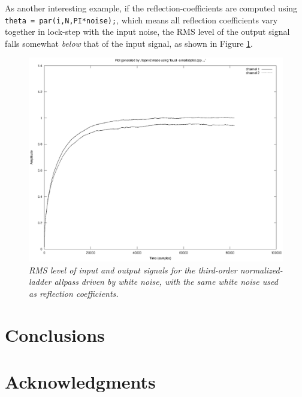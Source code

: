 \documentclass[twoside,a4paper]{article}
\begin{document}
As another interesting example, if the reflection-coefficients are
computed using \verb!theta = par(i,N,PI*noise);!, which means all
reflection coefficients vary together in lock-step with the input
noise, the RMS level of the output signal falls somewhat \emph{below}
that of the input signal, as shown in Figure \ref{tapnn2tc}.

\begin{figure}[ht]
\center
\includegraphics[width=6.5in]{eps/tapnn2tc.eps}
\caption{\label{tapnn2tc}{\it RMS level of input and output signals
for the third-order normalized-ladder allpass driven by white noise,
with the same white noise used as reflection coefficients.}}
\end{figure} 

\section{Conclusions}

\section{Acknowledgments}

{\small\raggedright
\nocite{*}


}
\end{document}
